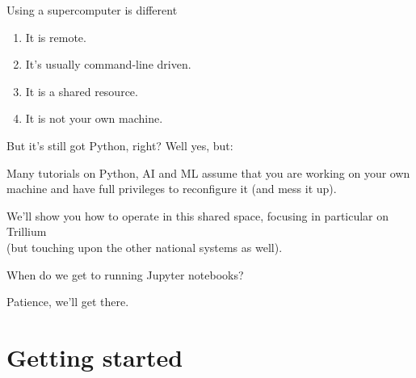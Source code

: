 \documentclass[
  10pt,
  ignorenonframetext,
  aspectratio=169,handout]{beamer}
\begin{document}
\begin{frame}{Using a supercomputer is different}
\label{using-a-supercomputer-is-different}
\pause

\begin{enumerate}
\item
  It is remote.

  \pause
\item
  It's usually command-line driven.

  \pause
\item
  It is a shared resource.

  \pause
\item
  It is not your own machine.
\end{enumerate}
\end{frame}

\begin{frame}{But it's still got Python, right?}
\label{but-its-still-got-python-right}
Well yes, but:

\pause

\begin{block}{}\setlength{\parskip}{0.5\baselineskip}
\label{section}
Many tutorials on Python, AI and ML assume that you are working on your own machine and have full privileges to reconfigure it (and mess it up). \vspace{\baselineskip}

\pause
\end{block}

\begin{block}{}\setlength{\parskip}{0.5\baselineskip}
\label{section-1}
We'll show you how to operate in this shared space, focusing in particular on Trillium\\
(but touching upon the other national systems as well). \vspace{\baselineskip}

\pause
\end{block}

\begin{block}{When do we get to running Jupyter notebooks?}\setlength{\parskip}{0.5\baselineskip}
\label{when-do-we-get-to-running-jupyter-notebooks}
\pause

Patience, we'll get there. \vspace{\baselineskip}
\end{block}
\end{frame}

\section{Getting started}\label{getting-started}
\end{document}
